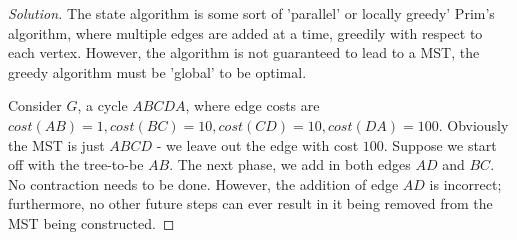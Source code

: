 \documentclass[10pt]{article}
\begin{document}
\begin{proof}[Solution]
The state algorithm is some sort of 'parallel' or locally greedy' Prim's algorithm, where multiple edges are added at a time, greedily with respect to each vertex.  However, the algorithm is not guaranteed to lead to a MST, the greedy algorithm must be 'global' to be optimal.

Consider $G$, a cycle $ABCDA$, where edge costs are $cost(AB)=1, cost(BC)=10, cost(CD)=10, cost(DA)=100$. Obviously the MST is just $ABCD$ - we leave out the edge with cost $100$. Suppose we start off with the tree-to-be $AB$. The next phase, we add in both edges $AD$ and $BC$. No contraction needs to be done. However, the addition of edge $AD$ is incorrect; furthermore, no other future steps can ever result in it being removed from the MST being constructed.

\end{proof}
\end{document}
